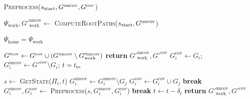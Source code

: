 \documentclass[conference]{IEEEtran}
\begin{document}
\begin{algorithm}[t]
\caption{\textsc{Preprocess}($s_{\textrm{start}},G^{\textrm{uncov}},G^{\textrm{cov}} $)}\label{alg:preprocess}
\begin{algorithmic}[1]
\State $\Psi_{\textrm{work}}, G'^{\textrm{uncov}}_{\textrm{work}} \leftarrow$ \textsc{ComputeRootPaths}($s_{\textrm{start}},G^{\textrm{uncov}}$)

\If {$\Sstart = \Shome$}
    \State $\Psi_{\textrm{home}} = \Psi_{\textrm{work}}$
\EndIf

\State $G'^{\textrm{cov}} \leftarrow 
    G^{\textrm{cov}} \cup (G^{\textrm{uncov}} \setminus G'^{\textrm{uncov}}_{\textrm{work}})$
    \State \textbf{return} $G'^{\textrm{uncov}}_{\textrm{work}}, G'^{\textrm{cov}}$
\EndIf
{}
    \State $G_i^{\textrm{cov}} \leftarrow G_i$;
            \hspace{2mm}
           $G_i^{\textrm{uncov}} \leftarrow G'^{\textrm{cov}} \setminus G_i$;
            \hspace{2mm}
           $t = t_{\textrm{rc}}$

        \State $s \leftarrow$ \textsc{GetState($\Pi_i, t$)}
                \State $G_i^{\textrm{uncov}} \leftarrow G_i^{\textrm{uncov}} \setminus G_j$
                \State $G_i^{\textrm{cov}} \leftarrow G_i^{\textrm{cov}} \cup G_j$
            \EndIf
        \EndFor
            \State \textbf{break}
        \EndIf
        \State $G_i^{\textrm{uncov}},G_i^{\textrm{cov}} \leftarrow$ \textsc{Preprocess}($s,G_i^{\textrm{uncov}},G_i^{\textrm{cov}}$)
            \State \textbf{break}
        \EndIf
        \State $t \leftarrow t - \delta_t$
    \EndWhile
\EndFor
\State \textbf{return} $G'^{\textrm{uncov}}_{\textrm{work}}, G'^{\textrm{cov}}$

\end{algorithmic}
\end{algorithm}

\end{document}
